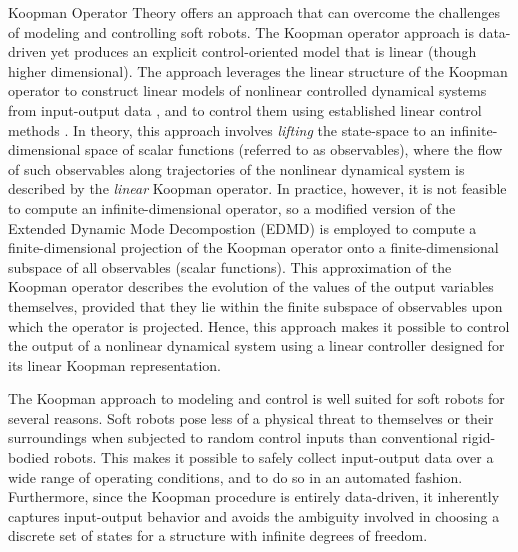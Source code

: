 Koopman Operator Theory offers an approach that can overcome the challenges of modeling and controlling soft robots.
The Koopman operator approach is data-driven yet produces an explicit control-oriented model that is linear (though higher dimensional).
The approach leverages the linear structure of the Koopman operator to construct linear models of nonlinear controlled dynamical systems from input-output data \cite{bruder2018nonlinear, mauroy2016linear}, and to control them using established linear control methods \cite{Abraham-RSS-17, korda2018linear}.
In theory, this approach involves \emph{lifting} the state-space to an infinite-dimensional space of scalar functions (referred to as observables), where the flow of such observables along trajectories of the nonlinear dynamical system is described by the \emph{linear} Koopman operator.
In practice, however, it is not feasible to compute an infinite-dimensional operator, so a modified version of the Extended Dynamic Mode Decompostion (EDMD) is employed to compute a finite-dimensional projection of the Koopman operator onto a finite-dimensional subspace of all observables (scalar functions).
This approximation of the Koopman operator describes the evolution of the values of the output variables themselves, provided that they lie within the finite subspace of observables upon which the operator is projected.
Hence, this approach makes it possible to control the output of a nonlinear dynamical system using a linear controller designed for its linear Koopman representation.

The Koopman approach to modeling and control is well suited for soft robots for several reasons.
Soft robots pose less of a physical threat to themselves or their surroundings when subjected to random control inputs than conventional rigid-bodied robots. 
This makes it possible to safely collect input-output data over a wide range of operating conditions, and to do so in an automated fashion. 
Furthermore, since the Koopman procedure is entirely data-driven, it inherently captures input-output behavior and avoids the ambiguity involved in choosing a discrete set of states for a structure with infinite degrees of freedom.

